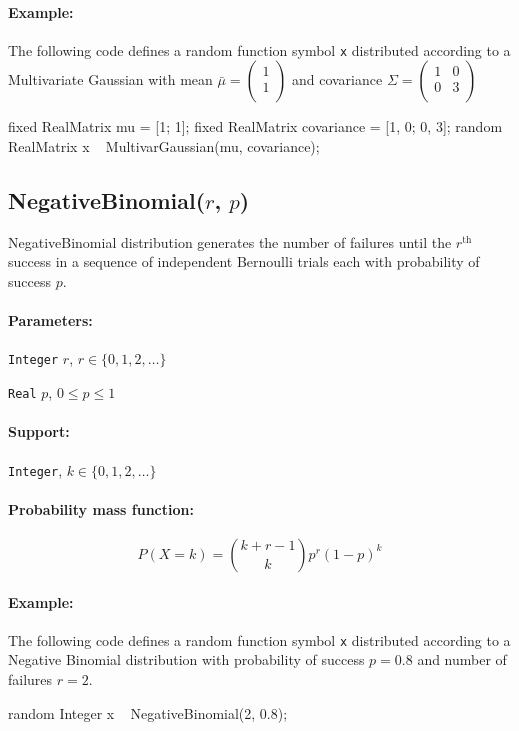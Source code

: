 \paragraph*{Example:}
The following code defines a random function symbol \verb|x| distributed according to a Multivariate Gaussian with mean $\bar{\mu} = 
\begin{pmatrix}
  1  \\
  1  \\ 
 \end{pmatrix}$ and covariance $\Sigma = 
 \begin{pmatrix}
   1 & 0 \\
   0 & 3 \\
  \end{pmatrix}
 $
\begin{blogcode}
fixed RealMatrix mu = [1; 1];
fixed RealMatrix covariance = [1, 0; 0, 3];
random RealMatrix x ~ MultivarGaussian(mu, covariance);
\end{blogcode}

\subsection{NegativeBinomial($r$, $p$)}
NegativeBinomial distribution generates the number of failures until the $r^{\text{th}}$ success in a sequence of independent Bernoulli trials each with probability of success $p$.

\paragraph*{Parameters:} 
\begin{itemize*}
\item[] \verb|Integer| $r$, $r \in \{0, 1, 2, \ldots \}$
\item[] \verb|Real| $p$, $0 \leq p \leq 1$ 
\end{itemize*}

\paragraph*{Support:} \verb|Integer|, $k \in \{0, 1, 2, \ldots \}$ 

\paragraph*{Probability mass function:}
\[
	P(X = k) = \binom{k + r - 1}{k} p^{r} (1-p)^{k} 
\]

\paragraph*{Example:}
The following code defines a random function symbol \verb|x| distributed according to a Negative Binomial distribution with probability of success $p = 0.8$ and number of failures $r = 2$.
\begin{blogcode}
random Integer x ~ NegativeBinomial(2, 0.8);
\end{blogcode}


